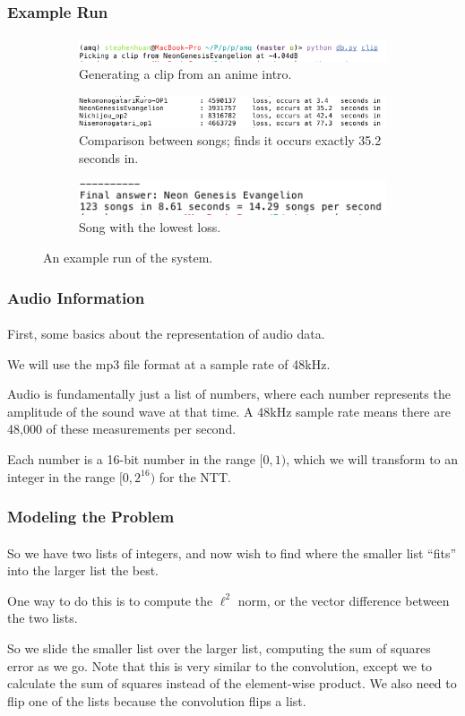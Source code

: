 \documentclass[11pt,handout]{beamer}             %
\begin{document}
\begin{frame}
\frametitle{Example Run}
\framesubtitle{}
\begin{figure}[h!]
    \begin{subfigure}[h]{0.8 \textwidth}
      \includegraphics[scale=0.5]{clip.png}
      \caption{Generating a clip from an anime intro.}
    \end{subfigure}
    
    \begin{subfigure}[h]{0.4 \textwidth}
      \includegraphics[scale=0.3]{compare.png}
      \caption{Comparison between songs; finds it occurs exactly 35.2 seconds in.}
    \end{subfigure}
    \hfill
    \begin{subfigure}[h]{0.4 \textwidth}
      \includegraphics[scale=0.3]{result.png}
      \caption{Song with the lowest loss.}
    \end{subfigure}
    \caption{An example run of the system.}
\end{figure}
\end{frame}

\begin{frame}
\frametitle{Audio Information}
\framesubtitle{}
First, some basics about the representation of audio data. \pause

We will use the mp3 file format at a sample rate of 48kHz. \pause 

Audio is fundamentally just a list of numbers, where each number represents
the amplitude of the sound wave at that time. A 48kHz sample rate means 
there are 48,000 of these measurements per second. \pause

Each number is a 16-bit number in the range \( [0, 1) \), which we
will transform to an integer in the range \( [0, 2^{16}) \) for the NTT.
\end{frame}

\begin{frame}
\frametitle{Modeling the Problem}
\framesubtitle{}
So we have two lists of integers, and now wish to find where the smaller list
\enquote{fits} into the larger list the best. \pause

One way to do this is to compute the \alert{\( \ell^2 \) norm},
or the vector difference between the two lists. \pause

So we slide the smaller list over the larger list, computing the sum of squares
error as we go. Note that this is very similar to the convolution, except
we to calculate the sum of squares instead of the element-wise product.
We also need to flip one of the lists because the convolution flips a list.
\end{frame}
\end{document}
